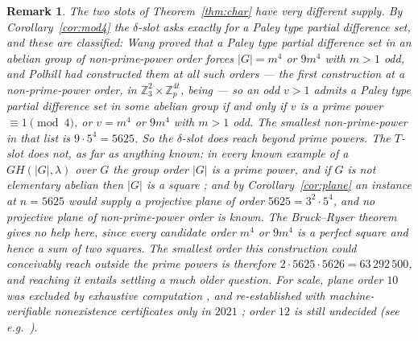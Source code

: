 \documentclass[11pt]{article}
\newtheorem{remark}{Remark}
\newcommand{\Z}{\mathbb Z}
\begin{document}
\begin{remark}\label{rem:supply}
The two slots of Theorem~\ref{thm:char} have very different supply.  By
Corollary~\ref{cor:mod4} the \(\delta\)-slot asks exactly for a Paley type
partial difference set, and these are classified: Wang \cite{Wang2020} proved
that a Paley type partial difference set in an abelian group of
non-prime-power order forces \(|G|=m^{4}\) or \(9m^{4}\) with \(m>1\) odd,
and Polhill \cite{Polhill2010} had constructed them at all such
orders --- the first construction at a non-prime-power order, in
\(\Z_3^{2}\times\Z_p^{4t}\), being \cite{Polhill2009} --- so
\cite[Thm.~1.2]{Wang2020} an odd \(v>1\) admits a Paley type
partial difference set in some abelian group if and only if \(v\) is a prime
power \(\equiv1\pmod4\), or \(v=m^{4}\) or \(9m^{4}\) with \(m>1\) odd.  The
smallest non-prime-power in that list is \(9\cdot5^{4}=5625\).  So the
\(\delta\)-slot does reach beyond prime powers.  The \(T\)-slot does not, as
far as anything known: in every known example of a \(GH(|G|,\lambda)\) over
\(G\) the group order \(|G|\) is a prime power, and if \(G\) is not
elementary abelian then \(|G|\) is a square
\cite[p.~303]{ColbournDinitz2007}; and by Corollary~\ref{cor:plane} an
instance at
\(n=5625\) would supply a projective plane of order \(5625=3^{2}\cdot5^{4}\),
and no projective plane of non-prime-power order is known.  The
Bruck--Ryser theorem \cite{BruckRyser1949} gives no help here, since every
candidate order \(m^{4}\) or \(9m^{4}\) is a perfect square and hence a sum of
two squares.  The smallest order this construction could conceivably reach
outside the prime powers is therefore \(2\cdot5625\cdot5626=63\,292\,500\), and
reaching it entails settling a much older question.  For scale, plane order
\(10\) was excluded by exhaustive computation
\cite{LamThielSwiercz1989}, and re-established with machine-verifiable
nonexistence certificates only in \(2021\) \cite{BrightEtAl2021}; order
\(12\) is still undecided (see e.g.\ \cite{AkiyamaSuetakeTanaka2023}).
\end{remark}
\end{document}
